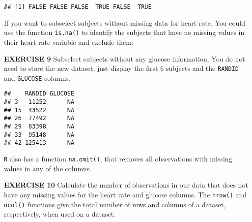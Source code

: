 \documentclass[
]{article}
\newenvironment{Shaded}{\begin{snugshade}}{\end{snugshade}}
\newcommand{\CommentTok}[1]{\textcolor[rgb]{0.56,0.35,0.01}{\textit{#1}}}
\newcommand{\KeywordTok}[1]{\textcolor[rgb]{0.13,0.29,0.53}{\textbf{#1}}}
\newcommand{\NormalTok}[1]{#1}
\newcommand{\OperatorTok}[1]{\textcolor[rgb]{0.81,0.36,0.00}{\textbf{#1}}}
\newcommand{\OtherTok}[1]{\textcolor[rgb]{0.56,0.35,0.01}{#1}}
\newcommand{\StringTok}[1]{\textcolor[rgb]{0.31,0.60,0.02}{#1}}
\begin{document}
\begin{verbatim}
## [1] FALSE FALSE FALSE  TRUE FALSE  TRUE
\end{verbatim}

If you want to subselect subjects without missing data for heart rate.
You could use the function \texttt{is.na()} to identify the subjects
that have no missing values in their heart rate variable and exclude
them:

\begin{Shaded}
\end{Shaded}

\textbf{EXERCISE 9} Subselect subjects without any glucose information.
You do not need to store the new dataset, just display the first 6
subjects and the \texttt{RANDID} and \texttt{GLUCOSE} columns.

\begin{Shaded}
\end{Shaded}

\begin{verbatim}
##    RANDID GLUCOSE
## 3   11252      NA
## 15  43522      NA
## 26  77492      NA
## 29  83398      NA
## 33  95148      NA
## 42 125413      NA
\end{verbatim}

\texttt{R} also has a function \texttt{na.omit()}, that removes all
observations with missing values in any of the columns.

\textbf{EXERCISE 10} Calculate the number of observations in our data
that does not have any missing values for the heart rate and glucose
columns. The \texttt{nrow()} and \texttt{ncol()} functions give the
total number of rows and columns of a dataset, respectively, when used
on a dataset.

\begin{Shaded}
\end{Shaded}
\end{document}

